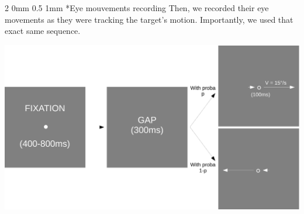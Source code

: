 \documentclass[profile,final,english, draft]{article}%
\makeatletter
\renewcommand{\section}{\@startsection
        {section}%
        {1}%
        {0mm}%
        {1\baselineskip}%
        {1mm}%
        {\large\color{red}\bfseries}}%
\renewcommand{\subsection}{\@startsection
        {subsection}%
        {2}%
        {0mm}%
        {0.5\baselineskip}%
        {1mm}%
        {\normalsize\color[rgb]{0.4,0,0}\bfseries}}%
\makeatother
\begin{document}
\begin{multicols}{3}
\subsection*{Eye mouvements recording}
Then, we recorded their eye movements as they were tracking the target's motion. Importantly, we used that exact same sequence.
\begin{center} 
    \includegraphics[width=1\columnwidth]{materiel_recording}
\end{center}









\end{multicols}
\end{document}
